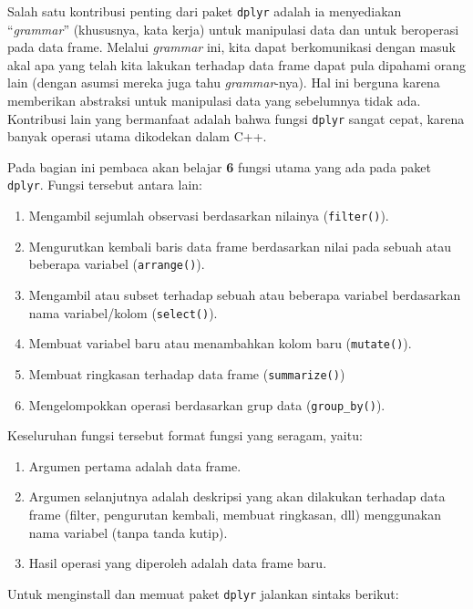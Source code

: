 \documentclass[]{book}
\providecommand{\tightlist}{%
  \setlength{\itemsep}{0pt}\setlength{\parskip}{0pt}}
\begin{document}
Salah satu kontribusi penting dari paket \texttt{dplyr} adalah ia
menyediakan ``\emph{grammar}'' (khususnya, kata kerja) untuk manipulasi
data dan untuk beroperasi pada data frame. Melalui \emph{grammar} ini,
kita dapat berkomunikasi dengan masuk akal apa yang telah kita lakukan
terhadap data frame dapat pula dipahami orang lain (dengan asumsi mereka
juga tahu \emph{grammar}-nya). Hal ini berguna karena memberikan
abstraksi untuk manipulasi data yang sebelumnya tidak ada. Kontribusi
lain yang bermanfaat adalah bahwa fungsi \texttt{dplyr} sangat cepat,
karena banyak operasi utama dikodekan dalam C++.

Pada bagian ini pembaca akan belajar \textbf{6} fungsi utama yang ada
pada paket \texttt{dplyr}. Fungsi tersebut antara lain:

\begin{enumerate}
\def\labelenumi{\arabic{enumi}.}
\tightlist
\item
  Mengambil sejumlah observasi berdasarkan nilainya (\texttt{filter()}).
\item
  Mengurutkan kembali baris data frame berdasarkan nilai pada sebuah
  atau beberapa variabel (\texttt{arrange()}).
\item
  Mengambil atau subset terhadap sebuah atau beberapa variabel
  berdasarkan nama variabel/kolom (\texttt{select()}).
\item
  Membuat variabel baru atau menambahkan kolom baru (\texttt{mutate()}).
\item
  Membuat ringkasan terhadap data frame (\texttt{summarize()})
\item
  Mengelompokkan operasi berdasarkan grup data (\texttt{group\_by()}).
\end{enumerate}

Keseluruhan fungsi tersebut format fungsi yang seragam, yaitu:

\begin{enumerate}
\def\labelenumi{\arabic{enumi}.}
\tightlist
\item
  Argumen pertama adalah data frame.
\item
  Argumen selanjutnya adalah deskripsi yang akan dilakukan terhadap data
  frame (filter, pengurutan kembali, membuat ringkasan, dll) menggunakan
  nama variabel (tanpa tanda kutip).
\item
  Hasil operasi yang diperoleh adalah data frame baru.
\end{enumerate}

Untuk menginstall dan memuat paket \texttt{dplyr} jalankan sintaks
berikut:
\end{document}
